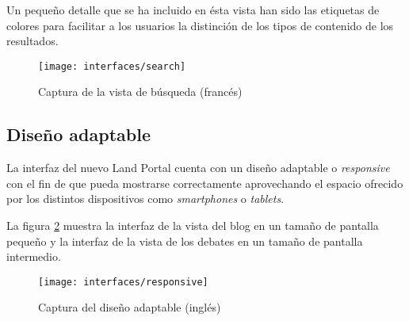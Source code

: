 Un pequeño detalle que se ha incluido en ésta vista han sido las etiquetas de colores para facilitar a los usuarios la distinción de los tipos de contenido de los resultados.
\begin{figure}[h]
	\centering
	\texttt{[image: interfaces/search]}
	\caption{Captura de la vista de búsqueda (francés)}
	\label{fig:interface_busqued}
\end{figure}


\subsection{Diseño adaptable}
La interfaz del nuevo Land Portal cuenta con un diseño adaptable o \textit{responsive} con el fin de que pueda mostrarse correctamente aprovechando el espacio ofrecido por los distintos dispositivos como \textit{smartphones} o \textit{tablets}.

La figura \ref{fig:interface_responsive} muestra la interfaz de la vista del blog en un tamaño de pantalla pequeño y la interfaz de la vista de los debates en un tamaño de pantalla intermedio.

\begin{figure}[h]
	\centering
	\texttt{[image: interfaces/responsive]}
	\caption{Captura del diseño adaptable (inglés)}
	\label{fig:interface_responsive}
\end{figure}